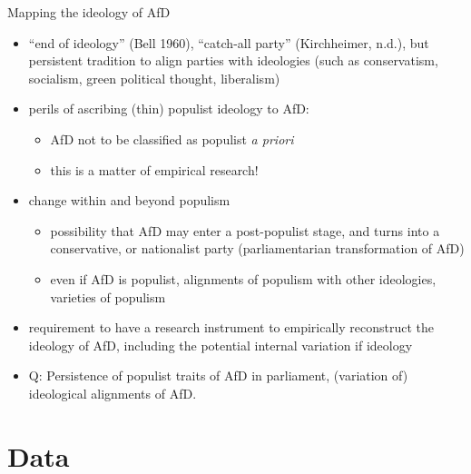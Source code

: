 \documentclass[
  ignorenonframetext,
]{beamer}
\providecommand{\tightlist}{%
  \setlength{\itemsep}{0pt}\setlength{\parskip}{0pt}}
\begin{document}
\begin{frame}{Mapping the ideology of AfD}
\protect\hypertarget{mapping-the-ideology-of-afd}{}

\begin{itemize}
\item
  ``end of ideology'' (Bell 1960), ``catch-all party'' (Kirchheimer,
  n.d.), but persistent tradition to align parties with ideologies (such
  as conservatism, socialism, green political thought, liberalism)
\item
  perils of ascribing (thin) populist ideology to AfD:

  \begin{itemize}
  \tightlist
  \item
    AfD not to be classified as populist \emph{a priori}
  \item
    this is a matter of empirical research!
  \end{itemize}
\item
  change within and beyond populism

  \begin{itemize}
  \tightlist
  \item
    possibility that AfD may enter a post-populist stage, and turns into
    a conservative, or nationalist party (parliamentarian transformation
    of AfD)
  \item
    even if AfD is populist, alignments of populism with other
    ideologies, varieties of populism
  \end{itemize}
\item
  requirement to have a research instrument to empirically reconstruct
  the ideology of AfD, including the potential internal variation if
  ideology
\item
  Q: Persistence of populist traits of AfD in parliament, (variation of)
  ideological alignments of AfD.
\end{itemize}

\end{frame}

\hypertarget{data}{%
\section{Data}\label{data}}
\end{document}

